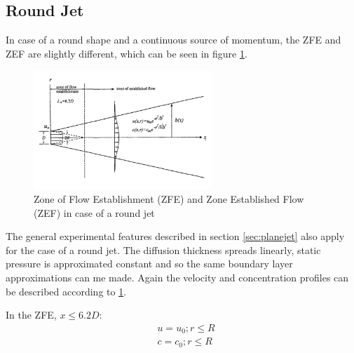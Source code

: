 

\newpage
\subsection{Round Jet}
In case of a round shape and a continuous source of momentum, the ZFE and ZEF are slightly different, which can be seen in figure \ref{fig:zone_round}.

\begin{figure}[H]
    \centering
    \includegraphics[width=0.6\textwidth]{Images/Round_Jet_flow.png}
    \caption{Zone of Flow Establishment (ZFE) and Zone Established Flow (ZEF) in case of a round jet}
    \label{fig:zone_round}
\end{figure}

\noindent The general experimental features described in section \ref{sec:planejet} also apply for the case of a round jet. The diffusion thickness spreads linearly, static pressure is approximated constant and so the same boundary layer approximations can me made. Again the velocity and concentration profiles can be described according to \ref{fig:zone_round}. \newline

\noindent In the ZFE, $x \leq 6.2D$:
\begin{equation}
    \begin{split}
        & u = u_0 ; r \leq R \\
        & c = c_0 ; r \leq R
    \end{split}
\end{equation}

